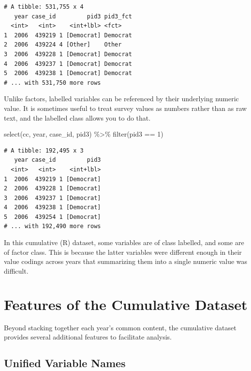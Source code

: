 \documentclass[10pt,article,oneside]{memoir}
\theoremstyle{definition}
\newenvironment{Shaded}{\begin{snugshade}}{\end{snugshade}}
\newcommand{\DecValTok}[1]{\textcolor[rgb]{0.00,0.00,0.81}{#1}}
\newcommand{\FunctionTok}[1]{\textcolor[rgb]{0.00,0.00,0.00}{#1}}
\newcommand{\NormalTok}[1]{#1}
\newcommand{\SpecialCharTok}[1]{\textcolor[rgb]{0.00,0.00,0.00}{#1}}
\begin{document}
\begin{verbatim}
# A tibble: 531,755 x 4
   year case_id         pid3 pid3_fct
  <int>   <int>    <int+lbl> <fct>   
1  2006  439219 1 [Democrat] Democrat
2  2006  439224 4 [Other]    Other   
3  2006  439228 1 [Democrat] Democrat
4  2006  439237 1 [Democrat] Democrat
5  2006  439238 1 [Democrat] Democrat
# ... with 531,750 more rows
\end{verbatim}

\noindent Unlike factors, labelled variables can be referenced by their
underlying numeric value. It is sometimes useful to treat survey values
as numbers rather than as raw text, and the labelled class allows you to
do that.

\begin{Shaded}
\begin{Highlighting}[]
\FunctionTok{select}\NormalTok{(cc, year, case\_id, pid3) }\SpecialCharTok{\%\textgreater{}\%} 
  \FunctionTok{filter}\NormalTok{(pid3 }\SpecialCharTok{==} \DecValTok{1}\NormalTok{)}
\end{Highlighting}
\end{Shaded}

\begin{verbatim}
# A tibble: 192,495 x 3
   year case_id         pid3
  <int>   <int>    <int+lbl>
1  2006  439219 1 [Democrat]
2  2006  439228 1 [Democrat]
3  2006  439237 1 [Democrat]
4  2006  439238 1 [Democrat]
5  2006  439254 1 [Democrat]
# ... with 192,490 more rows
\end{verbatim}

\indent In this cumulative (R) dataset, some variables are of class
labelled, and some are of factor class. This is because the latter
variables were different enough in their value codings across years that
summarizing them into a single numeric value was difficult.

\newpage

\hypertarget{features-of-the-cumulative-dataset}{%
\section{Features of the Cumulative
Dataset}\label{features-of-the-cumulative-dataset}}

Beyond stacking together each year's common content, the cumulative
dataset provides several additional features to facilitate analysis.

\hypertarget{unified-variable-names}{%
\subsection{Unified Variable Names}\label{unified-variable-names}}
\end{document}
